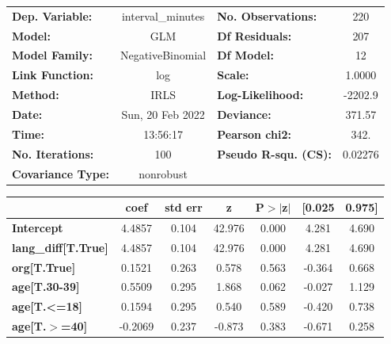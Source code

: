 \begin{center}
\begin{tabular}{lclc}
\toprule
\textbf{Dep. Variable:}      & interval\_minutes & \textbf{  No. Observations:  } &      220    \\
\textbf{Model:}              &        GLM        & \textbf{  Df Residuals:      } &      207    \\
\textbf{Model Family:}       &  NegativeBinomial & \textbf{  Df Model:          } &       12    \\
\textbf{Link Function:}      &        log        & \textbf{  Scale:             } &    1.0000   \\
\textbf{Method:}             &        IRLS       & \textbf{  Log-Likelihood:    } &   -2202.9   \\
\textbf{Date:}               &  Sun, 20 Feb 2022 & \textbf{  Deviance:          } &    371.57   \\
\textbf{Time:}               &      13:56:17     & \textbf{  Pearson chi2:      } &     342.    \\
\textbf{No. Iterations:}     &        100        & \textbf{  Pseudo R-squ. (CS):} &  0.02276    \\
\textbf{Covariance Type:}    &     nonrobust     & \textbf{                     } &             \\
\bottomrule
\end{tabular}
\begin{tabular}{lcccccc}
                             & \textbf{coef} & \textbf{std err} & \textbf{z} & \textbf{P$> |$z$|$} & \textbf{[0.025} & \textbf{0.975]}  \\
\midrule
\textbf{Intercept}           &       4.4857  &        0.104     &    42.976  &         0.000        &        4.281    &        4.690     \\
\textbf{lang\_diff[T.True]}  &       4.4857  &        0.104     &    42.976  &         0.000        &        4.281    &        4.690     \\
\textbf{org[T.True]}         &       0.1521  &        0.263     &     0.578  &         0.563        &       -0.364    &        0.668     \\
\textbf{age[T.30-39]}        &       0.5509  &        0.295     &     1.868  &         0.062        &       -0.027    &        1.129     \\
\textbf{age[T.<=18]}         &       0.1594  &        0.295     &     0.540  &         0.589        &       -0.420    &        0.738     \\
\textbf{age[T.$>$=40]}       &      -0.2069  &        0.237     &    -0.873  &         0.383        &       -0.671    &        0.258     \\

\end{tabular}
\end{center}
